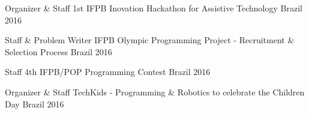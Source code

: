 \begin{cvhonors}
  \cvhonor
    {Organizer \& Staff} %
    {1st IFPB Inovation Hackathon for Assistive Technology} %
    {Brazil} %
    {2016} %

  \cvhonor
    {Staff \& Problem Writer} %
    {IFPB Olympic Programming Project - Recruitment \& Selection Process} %
    {Brazil} %
    {2016} %
    
  \cvhonor
    {Staff} %
    {4th IFPB/POP Programming Contest} %
    {Brazil} %
    {2016} %
    
  \cvhonor
    {Organizer \& Staff} %
    {TechKids - Programming \& Robotics to celebrate the Children Day} %
    {Brazil} %
    {2016} %

\end{cvhonors}
